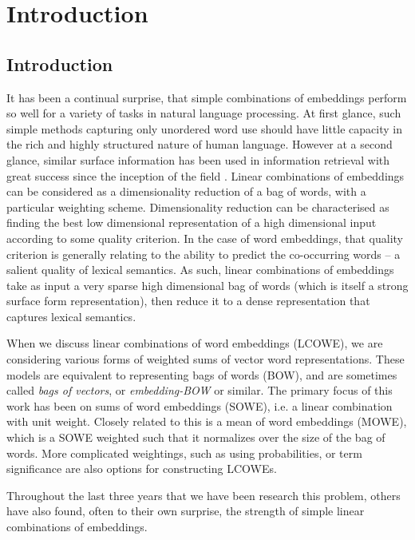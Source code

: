 \documentclass{book}
\begin{document}
\part {Introduction}
	
\chapter{Introduction}

It has been a continual surprise, that simple combinations of embeddings perform so well for a variety of tasks in natural language processing.
At first glance, such simple methods capturing only unordered word use should have little capacity in the rich and highly structured nature of human language.
However at a second glance, similar surface information has been used in information retrieval with great success since the inception of the field \citep{maron1961automatic}.
Linear combinations of embeddings can be considered as a dimensionality reduction of a bag of words, with a particular weighting scheme.
Dimensionality reduction can be characterised as finding the best low dimensional representation of a high dimensional input according to some quality criterion.
In the case of word embeddings, that quality criterion is generally relating to the ability to predict the co-occurring words -- a salient quality of lexical semantics.
As such, linear combinations of embeddings take as input a very sparse high dimensional bag of words (which is itself a strong surface form representation),
then reduce it to a dense representation that captures lexical semantics.

When we discuss linear combinations of word embeddings (LCOWE), we are considering various forms of weighted sums of vector word representations.
These models are equivalent to representing bags of words (BOW), and are sometimes called \emph{bags of vectors}, or \emph{embedding-BOW} or similar.
The primary focus of this work has been on sums of word embeddings (SOWE), i.e. a linear combination with unit weight.
Closely related to this is a mean of word embeddings (MOWE), which is a SOWE weighted such that it normalizes over the size of the bag of words.
More complicated weightings, such as using probabilities, or term significance are also options for constructing LCOWEs.



Throughout the last three years that we have been research this problem,
others have also found, often to their own surprise,
the strength of simple linear combinations of embeddings.
\end{document}
